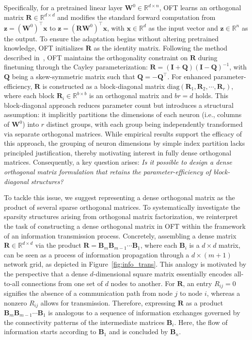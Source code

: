 Specifically, for a pretrained linear layer $\bm{W}^0\in\mathbb{R}^{d\times n}$, OFT learns an orthogonal matrix $\bm{R}\in\mathbb{R}^{d\times d}$ and modifies the standard forward computation from $\bm{z}=(\bm{W}^0)^\top\bm{x}$ to $\bm{z}=(\bm{R}\bm{W}^0)^\top\bm{x}$, with $\bm{x}\in\mathbb{R}^{d}$ as the input vector and $\bm{z}\in\mathbb{R}^{n}$ as the output. To ensure the adaptation begins without altering pretrained knowledge, OFT initializes $\bm{R}$ as the identity matrix. Following the method described in~\cite{qiu2023controlling,liu2021orthogonal}, OFT maintains the orthogonality constraint on $\bm{R}$ during finetuning through the Cayley parameterization: $\bm{R}=(\bm{I}+\bm{Q})(\bm{I}-\bm{Q})^{-1}$, with $\bm{Q}$ being a skew-symmetric matrix such that $\bm{Q}=-\bm{Q}^\top$. For enhanced parameter-efficiency, $\bm{R}$ is constructed as a block-diagonal matrix $\text{diag}(\bm{R}_1,\bm{R}_2,\cdots,\bm{R}_r)$, where each block $\bm{R}_i\in\mathbb{R}^{b\times b}$ is an orthogonal matrix and $br=d$ holds. This block-diagonal approach reduces parameter count but introduces a structural assumption: it implicitly partitions the dimensions of each neuron (i.e., columns of $\bm{W}^0$) into $r$ distinct groups, with each group being independently transformed via separate orthogonal matrices. While empirical results support the efficacy of this approach, the grouping of neuron dimensions by simple index partition lacks principled justification, thereby motivating interest in fully dense orthogonal matrices. Consequently, a key question arises: \emph{Is it possible to design a dense orthogonal matrix formulation that retains the parameter-efficiency of block-diagonal structures?}

To tackle this issue, we suggest representing a dense orthogonal matrix as the product of several sparse orthogonal matrices. To systematically investigate the sparsity structures arising from orthogonal matrix factorization, we reinterpret the task of constructing a dense orthogonal matrix in OFT within the framework of an information transmission process. Concretely, assembling a dense matrix $\bm{R}\in\mathbb{R}^{d\times d}$ via the product $\bm{R}=\bm{B}_m\bm{B}_{m-1}\cdots\bm{B}_1$, where each $\bm{B}_i$ is a $d \times d$ matrix, can be seen as a process of information propagation through a $d\times (m+1)$ network grid, as depicted in Figure~\ref{fig:info_trans}. This analogy is motivated by the perspective that a dense $d$-dimensional square matrix essentially encodes all-to-all connections from one set of $d$ nodes to another. For $\bm{R}$, an entry $R_{ij}=0$ signifies the absence of a communication path from node $j$ to node $i$, whereas a nonzero $R_{ij}$ allows for transmission. Therefore, expressing $\bm{R}$ as a product $\bm{B}_m\bm{B}_{m-1}\cdots\bm{B}_1$ is analogous to a sequence of information exchanges governed by the connectivity patterns of the intermediate matrices $\bm{B}_i$. Here, the flow of information starts according to $\bm{B}_1$ and is concluded by $\bm{B}_n$. 

